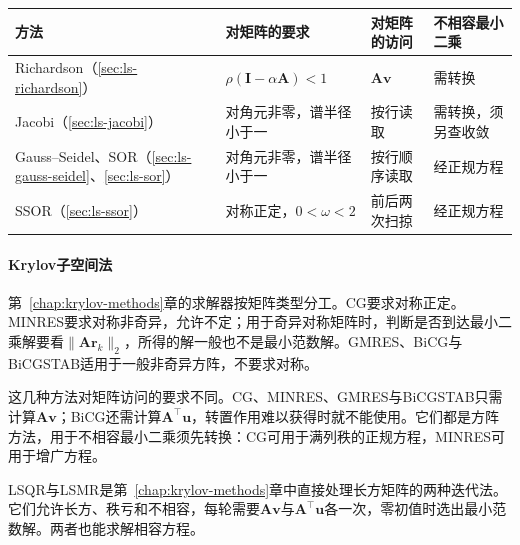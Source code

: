 \begin{BookInlineTable}
\small
\begin{tabular}{@{}>{\RaggedRight\arraybackslash}p{22mm}>{\RaggedRight\arraybackslash}p{}>{\RaggedRight\arraybackslash}p{}>{\RaggedRight\arraybackslash}p{}@{}}
\toprule
方法 & 对矩阵的要求 & 对矩阵的访问 & 不相容最小二乘\\
\midrule
Richardson（\ref{sec:ls-richardson}） & $\rho(\bm I-\alpha\bm A)<1$ & $\bm A\bm v$ & 需转换\\
Jacobi（\ref{sec:ls-jacobi}） & 对角元非零，谱半径小于一 & 按行读取 & 需转换，须另查收敛\\
Gauss--Seidel、SOR（\ref{sec:ls-gauss-seidel}、\ref{sec:ls-sor}） & 对角元非零，谱半径小于一 & 按行顺序读取 & 经正规方程\\
SSOR（\ref{sec:ls-ssor}） & 对称正定，$0<\omega<2$ & 前后两次扫掠 & 经正规方程\\
\bottomrule
\end{tabular}
\caption{定常迭代的矩阵条件与适用方式（基本版本）。括号内为对应小节。}
\label{tab:ls-stationary-method-applicability}
\end{BookInlineTable}

\paragraph{Krylov子空间法}
第~\ref{chap:krylov-methods}章的求解器按矩阵类型分工。CG要求对称正定。MINRES要求对称非奇异，允许不定；用于奇异对称矩阵时，判断是否到达最小二乘解要看$\lVert\bm A\bm r_k\rVert_2$，所得的解一般也不是最小范数解。GMRES、BiCG与BiCGSTAB适用于一般非奇异方阵，不要求对称。

这几种方法对矩阵访问的要求不同。CG、MINRES、GMRES与BiCGSTAB只需计算$\bm A\bm v$；BiCG还需计算$\bm A^\top\bm u$，转置作用难以获得时就不能使用。它们都是方阵方法，用于不相容最小二乘须先转换：CG可用于满列秩的正规方程，MINRES可用于增广方程。

LSQR与LSMR是第~\ref{chap:krylov-methods}章中直接处理长方矩阵的两种迭代法。它们允许长方、秩亏和不相容，每轮需要$\bm A\bm v$与$\bm A^\top\bm u$各一次，零初值时选出最小范数解。两者也能求解相容方程。

